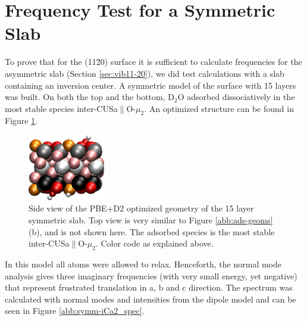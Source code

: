 \documentclass[11pt,DIV=13,BCOR=5mm,a4paper,headinclude]{scrbook}
\begin{document}
\section{Frequency Test for a Symmetric Slab}\label{symmetric_slab}
To prove that for the (11\=20) surface it is sufficient to calculate frequencies for the asymmetric slab (Section \ref{sec:vib11-20}), we did test calculations with a slab containing an inversion center.
A symmetric model of the surface with 15 layers was built.
On both the top and the bottom, D$_2$O adsorbed dissociatively in the most stable species inter-CUSa$\parallel$O-$\mu_2$.
An optimized structure can be found in Figure \ref{abb:symm-slab}.
 \begin{figure} [!h]
 \centering
 \includegraphics[width=0.3\textwidth]{figures/11-20/side_symmcell_iCa2.png}
  \caption{Side view of the PBE+D2 optimized geometry of the 15 layer symmetric slab.
  Top view is very similar to Figure \ref{abb:ads-geoms}(b), and is not shown here.
The adsorbed species is the most stable inter-CUSa$\parallel$O-$\mu_2$.
Color code as explained above.} 
        \label{abb:symm-slab}
 \end{figure}
In this model all atoms were allowed to relax.
Henceforth, the normal mode analysis gives three imaginary frequencies (with very small energy, yet negative) that represent frustrated translation in a, b and c direction.
The spectrum was calculated with normal modes  and intensities from the dipole model and can be seen in Figure \ref{abb:symm-iCa2_spec}.
\end{document}
